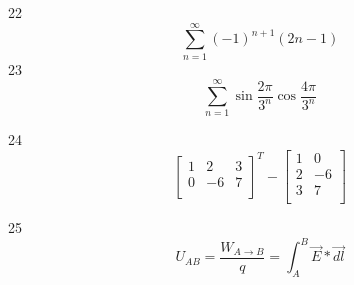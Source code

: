 \documentclass[a4paper]{article}
\begin{document}
22
$$
\sum_{n=1}^\infty (-1)^{n+1} (2n-1)
$$
23
$$
\sum_{n=1} ^ \infty \sin\frac{2\pi}{3^n}\cos\frac{4\pi}{3^n}
$$

24
$$
\left[\begin{array}{lll}
1 & 2 & 3 \\
0 & -6 & 7 \\
\end{array}\right]^T
-
\left[\begin{array}{ll}
1 & 0 \\
2 & -6 \\
3 & 7 \\

\end{array}\right]
$$

25
$$
U_{AB} = \frac{W_{A \rightarrow B}}{q} = \int_{A}^B \vec{E} * \vec{dl}
$$
\end{document}

